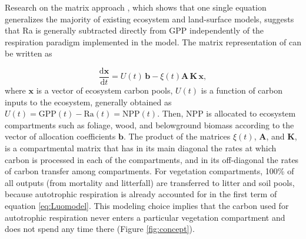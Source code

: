 \documentclass[bg, manuscript]{copernicus}
\begin{document}
Research on the matrix approach \citep{Luo2017, Luo2022}, which shows that one single equation generalizes the majority of existing ecosystem and land-surface models, suggests that Ra is generally subtracted directly from GPP independently of the respiration paradigm implemented in the model.
The matrix representation of \citet{Luo2022} can be written as

\begin{equation} \label{eq:Luomodel}
\frac{\mathrm{d} \bm{x}}{\mathrm{d}t} =  U(t) \, \bm{b} - \xi(t) \mathbf{A} \, \mathbf{K} \, \bm{x},
\end{equation}
where $\bm{x}$ is a vector of ecosystem carbon pools, $U(t)$ is a function of carbon inputs to the ecosystem, generally obtained as $U(t) = \mathrm{GPP}(t) - \mathrm{Ra}(t) = \mathrm{NPP}(t)$. Then, NPP is allocated to ecosystem compartments such as foliage, wood, and belowground biomass according to the vector of allocation coefficients $\bm{b}$. The product of the matrices $\xi(t)$,  $\mathbf{A}$, and $\mathbf{K}$, is a compartmental matrix that has in its main diagonal the rates at which carbon is processed in each of the compartments, and in its off-diagonal the rates of carbon transfer among compartments. For vegetation compartments, 100\% of all outputs (from mortality and litterfall) are transferred to litter and soil pools, because autotrophic  respiration is already accounted for in the first term of  equation \eqref{eq:Luomodel}. This modeling choice implies that the carbon used for autotrophic respiration never enters a particular vegetation compartment and does not spend any time there (Figure \ref{fig:concept}).
\end{document}
